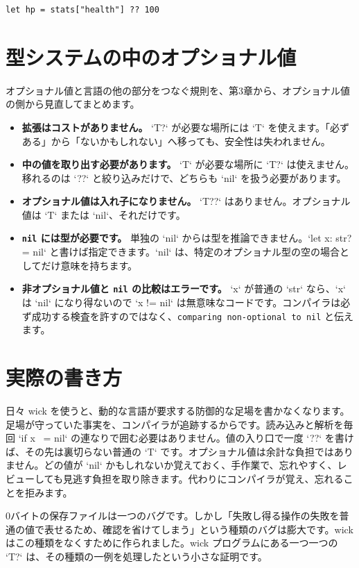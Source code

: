 \begin{lstlisting}[language=wick]
let hp = stats["health"] ?? 100
\end{lstlisting}

\section{型システムの中のオプショナル値}

オプショナル値と言語の他の部分をつなぐ規則を、第3章から、オプショナル値の側から見直してまとめます。

\begin{itemize}
\item \textbf{拡張はコストがありません。} `T?` が必要な場所には `T` を使えます。「必ずある」から「ないかもしれない」へ移っても、安全性は失われません。
\item \textbf{中の値を取り出す必要があります。} `T` が必要な場所に `T?` は使えません。移れるのは `??` と絞り込みだけで、どちらも `nil` を扱う必要があります。
\item \textbf{オプショナル値は入れ子になりません。} `T??` はありません。オプショナル値は `T` または `nil`、それだけです。
\item \textbf{\texttt{nil} には型が必要です。} 単独の `nil` からは型を推論できません。`let x: str? = nil` と書けば指定できます。`nil` は、特定のオプショナル型の空の場合としてだけ意味を持ちます。
\item \textbf{非オプショナル値と \texttt{nil} の比較はエラーです。} `x` が普通の `str` なら、`x` は `nil` になり得ないので `x != nil` は無意味なコードです。コンパイラは必ず成功する検査を許すのではなく、\texttt{comparing non-optional to nil} と伝えます。
\end{itemize}

\section{実際の書き方}

日々 wick を使うと、動的な言語が要求する防御的な足場を書かなくなります。足場が守っていた事実を、コンパイラが追跡するからです。読み込みと解析を毎回 `if x ~= nil` の連なりで囲む必要はありません。値の入り口で一度 `??` を書けば、その先は裏切らない普通の `T` です。オプショナル値は余計な負担ではありません。どの値が `nil` かもしれないか覚えておく、手作業で、忘れやすく、レビューしても見逃す負担を取り除きます。代わりにコンパイラが覚え、忘れることを拒みます。

0バイトの保存ファイルは一つのバグです。しかし「失敗し得る操作の失敗を普通の値で表せるため、確認を省けてしまう」という種類のバグは膨大です。wick はこの種類をなくすために作られました。wick プログラムにある一つ一つの `T?` は、その種類の一例を処理したという小さな証明です。
